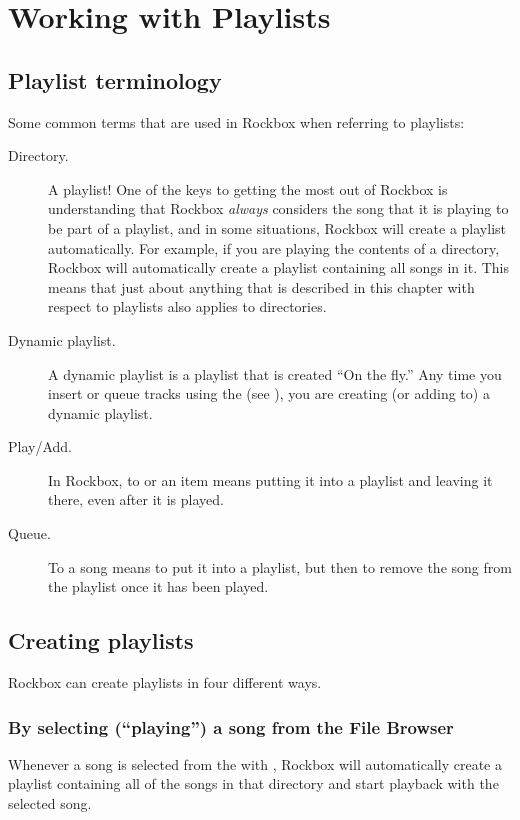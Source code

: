 \section{\label{ref:working_with_playlists}Working with Playlists}

\subsection{Playlist terminology}
Some common terms that are used in Rockbox when referring to
playlists:

\begin{description}
\item[Directory.] A playlist! One of the keys to getting the most out of
  Rockbox is understanding that Rockbox \emph{always} considers the song that
  it is playing to be part of a playlist, and in some situations, Rockbox will
  create a playlist automatically. For example, if you are playing the
  contents of a directory, Rockbox will automatically create a playlist
  containing all songs in it. This means that just about anything
  that is described in this chapter with respect to playlists also applies to
  directories.

\item[Dynamic playlist.]  A dynamic playlist is a playlist that is created
  ``On the fly.'' Any time you insert or queue tracks using the
   (see ), you are
  creating (or adding to) a dynamic playlist.

\item[Play/Add.] In Rockbox, to  or  an item means
  putting it into a playlist and leaving it there, even after it is
  played.

\item[Queue.] To  a song means to put it into a playlist, but then
  to remove the song from the playlist once it has been played.
\end{description}

\subsection{Creating playlists}

Rockbox can create playlists in four different ways.

\subsubsection{By selecting (``playing'') a song from the File Browser}
Whenever a song is selected from the  with
\ActionTreeEnter, Rockbox will automatically create a playlist containing
all of the songs in that directory and start playback with the selected
song.

